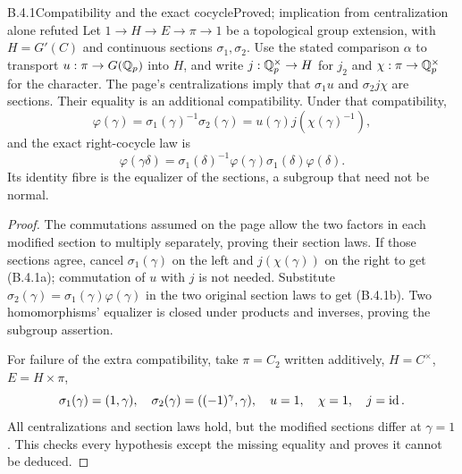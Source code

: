 \begin{result}{B.4.1}{Compatibility and the exact cocycle}{Proved; implication from centralization alone refuted}
Let $1\to H\to E\to\pi\to1$ be a topological group extension,
with $H=G'(C)$ and continuous sections $\sigma_1,\sigma_2$.
Use the stated comparison $\alpha$ to transport
$u:\pi\to G(\mathbb Q_p)$ into $H$, and write
$j:\mathbb Q_p^\times\to H$ for $j_2$ and
$\chi:\pi\to\mathbb Q_p^\times$ for the character. The page's
centralizations imply that $\sigma_1u$ and $\sigma_2j\chi$
are sections. Their equality is an additional compatibility.
Under that compatibility,
\[
 \varphi(\gamma)=\sigma_1(\gamma)^{-1}\sigma_2(\gamma)
                    =u(\gamma)j(\chi(\gamma)^{-1}),
 \tag{B.4.1a}
\]
and the exact right-cocycle law is
\[
 \varphi(\gamma\delta)=
 \sigma_1(\delta)^{-1}\varphi(\gamma)\sigma_1(\delta)
                                                 \varphi(\delta).
 \tag{B.4.1b}
\]
Its identity fibre is the equalizer of the sections, a subgroup
that need not be normal.
\end{result}
\begin{proof}
The commutations assumed on the page allow the two factors in
each modified section to multiply separately, proving their
section laws. If those sections agree, cancel $\sigma_1(\gamma)$
on the left and $j(\chi(\gamma))$ on the right to get
(B.4.1a); commutation of $u$ with $j$ is not needed.
Substitute $\sigma_2(\gamma)=\sigma_1(\gamma)\varphi(\gamma)$
in the two original section laws to get (B.4.1b). Two
homomorphisms' equalizer is closed under products and inverses,
proving the subgroup assertion.

For failure of the extra compatibility, take $\pi=C_2$ written
additively, $H=C^\times$, $E=H\times\pi$,
\[
 \sigma_1(\gamma)=(1,\gamma),\quad
 \sigma_2(\gamma)=((-1)^\gamma,\gamma),\quad
                  u=1,\quad\chi=1,\quad j=\operatorname{id}.
\]
All centralizations and section laws hold, but the modified
sections differ at $\gamma=1$. This checks every hypothesis
except the missing equality and proves it cannot be deduced.
\end{proof}

